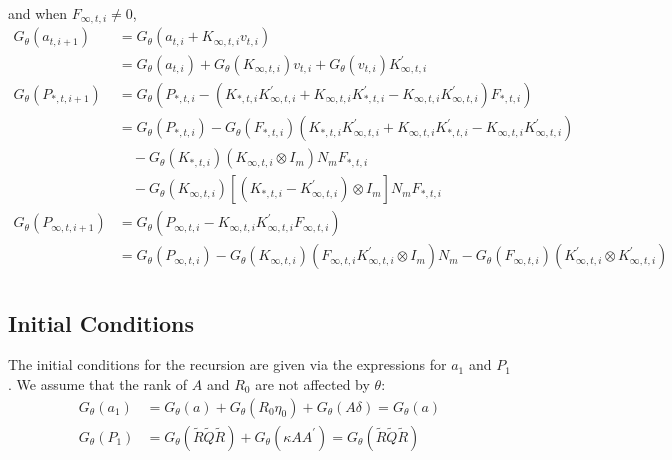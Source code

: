 \documentclass[12pt]{article}
\newcommand{\Gt}{G_\theta}
\begin{document}
	and when $F_{\infty,t,i} \neq 0$, 
	\begin{align*}
	\Gt(a_{t,i+1}) &= \Gt(a_{t,i} + K_{\infty,t,i} v_{t,i}) \\
	&= \Gt(a_{t,i}) + \Gt(K_{\infty,t,i})v_{t,i} + \Gt(v_{t,i}) K_{\infty,t,i}^\prime  \\
	\Gt(P_{*,t,i+1}) &= \Gt \left(P_{*,t,i} - (K_{*,t,i} K_{\infty,t,i}^\prime + K_{\infty,t,i} K_{*,t,i}^\prime - K_{\infty,t,i} K_{\infty,t,i}^\prime) F_{*,t,i} \right) \\
	&= \Gt(P_{*,t,i}) - \Gt (F_{*,t,i}) (K_{*,t,i} K_{\infty,t,i}^\prime + K_{\infty,t,i} K_{*,t,i}^\prime - K_{\infty,t,i} K_{\infty,t,i}^\prime) \\
	& \quad - \Gt(K_{*,t,i}) (K_{\infty,t,i} \otimes I_m) N_m F_{*,t,i}\\
	& \quad - \Gt(K_{\infty,t,i}) [(K_{*,t,i} - K_{\infty,t,i}^\prime) \otimes I_m] N_m F_{*,t,i}\\
	\Gt(P_{\infty,t,i+1}) &= \Gt(P_{\infty,t,i} - K_{\infty,t,i} K_{\infty,t,i}^\prime F_{\infty,t,i}) \\
	&= \Gt(P_{\infty,t,i}) - \Gt(K_{\infty,t,i})(F_{\infty,t,i} K_{\infty,t,i}^\prime \otimes I_m) N_m - \Gt(F_{\infty,t,i}) (K_{\infty,t,i}^\prime \otimes K_{\infty,t,i}^\prime) \\
	\end{align*}


\subsection*{Initial Conditions}
	The initial conditions for the recursion are given via the expressions for $a_1$ and $P_1$. We assume that the rank of $A$ and $R_0$ are not affected by $\theta$: 
	\begin{align*}
	\Gt(a_1) &= \Gt(a) + \Gt(R_0 \eta_0) + \Gt(A \delta) = \Gt(a) \\
	\Gt(P_1) &= \Gt(\tilde{R} \tilde{Q} \tilde{R}) + \Gt(\kappa A A^\prime) = \Gt(\tilde{R} \tilde{Q} \tilde{R})\\
	\end{align*}
\end{document}

